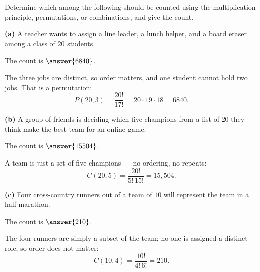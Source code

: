 \documentclass[12pt]{ximera}
\begin{document}
\begin{problem}
Determine which among the following should be counted using the multiplication
principle, permutations, or combinations, and give the count.

\begin{prompt}
\textbf{(a)} A teacher wants to assign a line leader, a lunch helper, and a board
eraser among a class of $20$ students.

\begin{multipleChoice}
\end{multipleChoice}

The count is $\answer{6840}$.

\begin{feedback}
The three jobs are distinct, so order matters, and one student cannot hold two jobs.
That is a permutation:
\[ P(20,3)=\frac{20!}{17!}=20\cdot 19\cdot 18 = 6840. \]
\end{feedback}
\end{prompt}

\begin{prompt}
\textbf{(b)} A group of friends is deciding which five champions from a list of $20$
they think make the best team for an online game.

\begin{multipleChoice}
\end{multipleChoice}

The count is $\answer{15504}$.

\begin{feedback}
A team is just a set of five champions --- no ordering, no repeats:
\[ C(20,5)=\frac{20!}{5!\,15!}=15{,}504. \]
\end{feedback}
\end{prompt}

\begin{prompt}
\textbf{(c)} Four cross-country runners out of a team of $10$ will represent the team
in a half-marathon.

\begin{multipleChoice}
\end{multipleChoice}

The count is $\answer{210}$.

\begin{feedback}
The four runners are simply a subset of the team; no one is assigned a distinct role,
so order does not matter:
\[ C(10,4)=\frac{10!}{4!\,6!}=210. \]
\end{feedback}
\end{prompt}
\end{problem}
\end{document}
